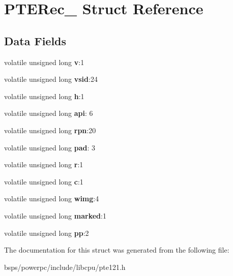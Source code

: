\hypertarget{structPTERec__}{}\section{P\+T\+E\+Rec\+\_\+ Struct Reference}
\label{structPTERec__}
\subsection*{Data Fields}
\begin{DoxyCompactItemize}
\item 
\mbox{\label{structPTERec___a4176acd00d804d87fd2b792d7ab84425}} 
volatile unsigned long {\bfseries v}\+:1
\item 
\mbox{\label{structPTERec___a6dc478ce5de96ff4ed81330b047333ce}} 
volatile unsigned long {\bfseries vsid}\+:24
\item 
\mbox{\label{structPTERec___a758f1c8a7a3c4c23c63eaa8230174201}} 
volatile unsigned long {\bfseries h}\+:1
\item 
\mbox{\label{structPTERec___af94e84be28b531d001bb83435e9ad1e8}} 
volatile unsigned long {\bfseries api}\+: 6
\item 
\mbox{\label{structPTERec___a257316aa9056bb29f1b8c8ed449202e6}} 
volatile unsigned long {\bfseries rpn}\+:20
\item 
\mbox{\label{structPTERec___af92583254db41fb7429af688e4f1ed3a}} 
volatile unsigned long {\bfseries pad}\+: 3
\item 
\mbox{\label{structPTERec___a3868bada7351d499b919d032795320e8}} 
volatile unsigned long {\bfseries r}\+:1
\item 
\mbox{\label{structPTERec___a8d2d1d0f1139b3dc029daa2f61a52828}} 
volatile unsigned long {\bfseries c}\+:1
\item 
\mbox{\label{structPTERec___a59a0e54615633330348fc9a609c6e37b}} 
volatile unsigned long {\bfseries wimg}\+:4
\item 
\mbox{\label{structPTERec___a9c0356d5d0dc264c41e2a91e13988d55}} 
volatile unsigned long {\bfseries marked}\+:1
\item 
\mbox{\label{structPTERec___acd4dd59afc7a9fd0db2ecdc03f86025c}} 
volatile unsigned long {\bfseries pp}\+:2
\end{DoxyCompactItemize}


The documentation for this struct was generated from the following file\+:\begin{DoxyCompactItemize}
\item 
bsps/powerpc/include/libcpu/pte121.\+h\end{DoxyCompactItemize}
